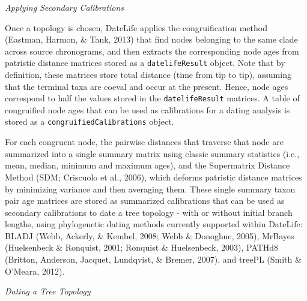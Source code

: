 \documentclass[english,man]{apa6}
\begin{document}
\begin{center}
\emph{Applying Secondary Calibrations}
\end{center}

Once a topology is chosen, DateLife applies the congruification method (Eastman, Harmon, \& Tank, 2013) that find nodes belonging to the same clade across source chronograms, and then extracts the corresponding node ages from patristic distance matrices stored as a \texttt{datelifeResult} object. Note that by definition, these matrices store total distance (time from tip to tip), assuming that the terminal taxa are coeval and occur at the present. Hence, node ages correspond to half the values stored in the \texttt{datelifeResult} matrices.
A table of congruified node ages that can be used as calibrations for a dating analysis is stored as a \texttt{congruifiedCalibrations} object.

For each congruent node, the pairwise distances that traverse that node are summarized into a single summary matrix using classic summary statistics (i.e., mean, median, minimum and maximum ages), and the Supermatrix Distance Method (SDM; Criscuolo et al., 2006), which deforms patristic distance matrices by minimizing variance and then averaging them.
These single summary taxon pair age matrices are stored as summarized calibrations that can be used as secondary calibrations to date a tree topology - with or without initial branch lengths, using phylogenetic dating methods currently supported within DateLife: BLADJ (Webb, Ackerly, \& Kembel, 2008; Webb \& Donoghue, 2005), MrBayes (Huelsenbeck \& Ronquist, 2001; Ronquist \& Huelsenbeck, 2003), PATHd8 (Britton, Anderson, Jacquet, Lundqvist, \& Bremer, 2007), and treePL (Smith \& O'Meara, 2012).

\begin{center}
\emph{Dating a Tree Topology}
\end{center}
\end{document}
